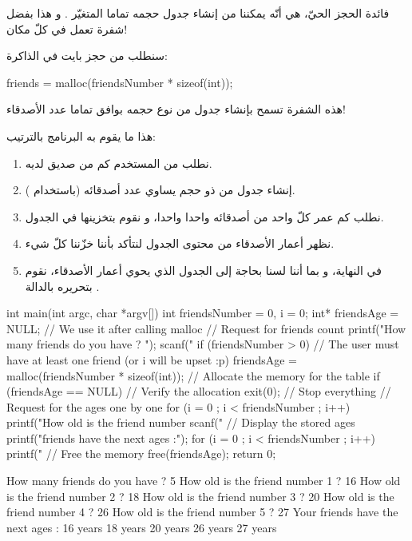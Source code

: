 فائدة الحجز الحيّ، هي أنّه يمكننا من إنشاء جدول حجمه تماما المتغيّر
.
و هذا بفضل شفرة تعمل في كلّ مكان!

سنطلب من
حجز
بايت في الذاكرة:

\begin{Csource}
friends = malloc(friendsNumber * sizeof(int));
\end{Csource}

هذه الشفرة تسمح بإنشاء جدول من نوع
حجمه بوافق تماما عدد الأصدقاء!

هذا ما يقوم به البرنامج بالترتيب:

\begin{enumerate}
  \item نطلب من المستخدم كم من صديق لديه.
  \item إنشاء جدول من
ذو حجم يساوي عدد أصدقائه (باستخدام
).
  \item نطلب كم عمر كلّ واحد من أصدقائه واحدا واحدا، و نقوم بتخزينها في الجدول.
  \item نظهر أعمار الأصدقاء من محتوى الجدول لنتأكد بأننا خزّننا كلّ شيء.
  \item في النهاية، و بما أننا لسنا بحاجة إلى الجدول الذي يحوي أعمار الأصدقاء، نقوم بتحريره بالدالة
.
\end{enumerate}

\begin{Csource}
int main(int argc, char *argv[])
{
  int friendsNumber = 0, i = 0;
  int* friendsAge = NULL; // We use it after calling malloc
  // Request for friends count
  printf("How many friends do you have ? ");
  scanf("%
  if (friendsNumber > 0) // The user must have at least one friend (or i will be upset :p)
  {
    friendsAge = malloc(friendsNumber * sizeof(int)); // Allocate the memory for the table
    if (friendsAge == NULL) // Verify the allocation
    {
      exit(0); // Stop everything
    }
    // Request for the ages one by one
    for (i = 0 ; i < friendsNumber ; i++)
    {
      printf("How old is the friend number %
      scanf("%
    }
    // Display the stored ages
    printf("\n\nYour friends have the next ages :\n");
    for (i = 0 ; i < friendsNumber ; i++)
    {
      printf("%
    }
    // Free the memory
    free(friendsAge);
  }
  return 0;
}
\end{Csource}

\begin{Console}
How many friends do you have ? 5
How old is the friend number 1 ? 16
How old is the friend number 2 ? 18
How old is the friend number 3 ? 20
How old is the friend number 4 ? 26
How old is the friend number 5 ? 27
Your friends have the next ages :
16 years
18 years
20 years
26 years
27 years
\end{Console}

